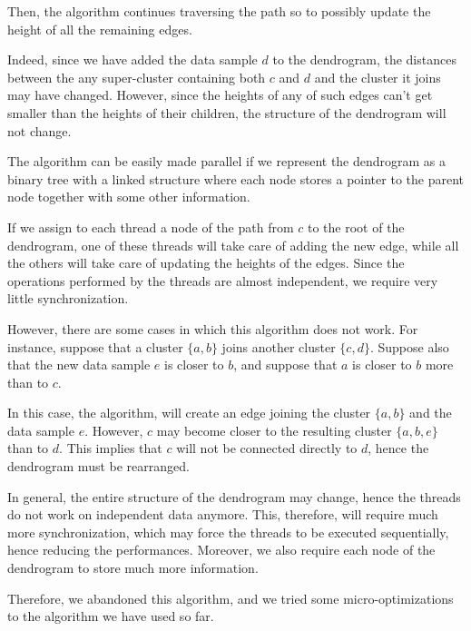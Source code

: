 \documentclass{article}
\begin{document}
Then, the algorithm continues traversing the path so to possibly update the height of all the
remaining edges.

Indeed, since we have added the data sample $d$ to the dendrogram, the distances between the
any super-cluster containing both $c$ and $d$ and the cluster it joins may have changed.
However, since the heights of any of such edges can't get smaller than the heights of
their children, the structure of the dendrogram will not change.

The algorithm can be easily made parallel if we represent the dendrogram as a binary tree with a
linked structure where each node stores a pointer to the parent node together with some other
information.

If we assign to each thread a node of the path from $c$ to the root of the
dendrogram, one of these threads will take care of adding the new edge, while all the others will
take care of updating the heights of the edges.
Since the operations performed by the threads are almost independent, we require very little
synchronization.

However, there are some cases in which this algorithm does not work.
For instance, suppose that a cluster $\{a, b\}$ joins another cluster $\{c, d\}$.
Suppose also that the new data sample $e$ is closer to $b$, and suppose that $a$ is closer to $b$
more than to $c$.

In this case, the algorithm, will create an edge joining the cluster $\{a, b\}$ and the data sample
$e$. However, $c$ may become closer to the resulting cluster $\{a, b, e\}$ than to $d$. This
implies that $c$ will not be connected directly to $d$, hence the dendrogram must be rearranged.

In general, the entire structure of the dendrogram may change, hence the threads do not
work on independent data anymore.
This, therefore, will require much more synchronization, which may force the threads to be
executed sequentially, hence reducing the performances.
Moreover, we also require each node of the dendrogram to store much more information.

Therefore, we abandoned this algorithm, and we tried some micro-optimizations to the algorithm we
have used so far.

%
%
%
\end{document}
